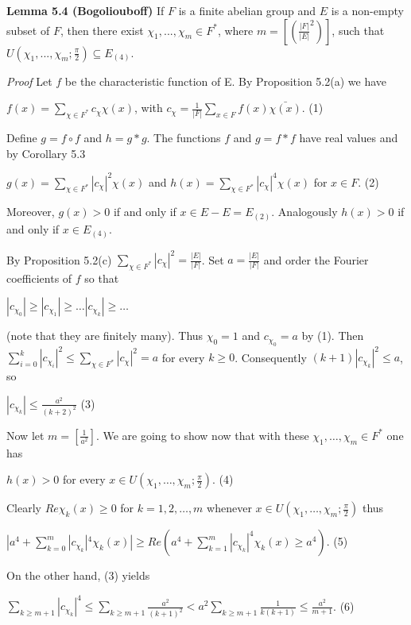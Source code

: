 \documentclass[12pt]{article}
\begin{document}
\textbf{Lemma 5.4 (Bogoliouboff)} If $F$ is a finite abelian group and $E$ is a non-empty subset of $F$, then
there exist $\chi_1, . . . , \chi_m \in F^*$, where $m = [(\frac{|F|}{|E|}^2)]$, such that $U(\chi_1, . . . , \chi_m ; \frac{\pi}{2}) \subseteq E_{(4)}$.


\emph{Proof} Let $f$ be the characteristic function of E. By Proposition 5.2(a) we have


    $f(x) = \sum_{\chi \in F^*} c_\chi \chi(x)$, with $c_\chi = \frac{1}{|F|} \sum_{x \in F} f(x) \bar{\chi(x)}$.  (1)


Define $g = f \circ f$ and $h = g * g$. The functions $f$ and $g = f * f$ have real values and by Corollary 5.3


    $g(x) = \sum_{\chi \in F^*} |c_\chi|^2 \chi(x)$ and $h(x) = \sum_{\chi \in F^*} |c_\chi|^4 \chi(x)$ for $x \in F$.  (2)


Moreover, $g(x) > 0$ if and only if $x \in E - E = E_{(2)}$. Analogously $h(x) > 0$ if and only if $x \in E_{(4)}$.


    By Proposition 5.2(c) $\sum_{\chi \in F^*} |c_\chi|^2 = \frac{|E|}{|F|}$. Set $a = \frac{|E|}{|F|}$ and order the Fourier coefficients of $f$ so that


        $|c_{\chi_0}| \geq |c_{\chi_1}| \geq \dots |c_{\chi_k}| \geq \dots$


(note that they are finitely many). Thus $\chi_0 = 1$ and $c_{\chi_0} = a$ by (1). Then $\sum^k_{i=0} |c_{\chi_i}|^2 \leq \sum_{\chi \in F^*} |c_\chi|^2 = a$ for
every $k \geq 0$. Consequently $(k + 1) |c_{\chi_k}|^2 \leq a$, so


        $|c_{\chi_k}| \leq \frac{a^2}{(k + 2)^2}$  (3)


Now let $m = [\frac{1}{a^2}]$. We are going to show now that with these $\chi_1, \dots, \chi_m \in F^*$ one has


    $h(x) > 0$ for every $x \in U(\chi_1, \dots, \chi_m; \frac{\pi}{2})$.  (4)


Clearly $Re\chi_k(x) \geq 0$ for $k = 1,2, \dots, m$ whenever $x \in U(\chi_1, \dots, \chi_m; \frac{\pi}{2})$ thus


    $|a^4 + \sum^m_{k = 0} |c_{\chi_k}|^4 \chi_k(x)| \geq Re(a^4 + \sum^m_{k=1} |c_{\chi_k}|^4 \chi_k (x) \geq a^4)$.  (5)


On the other hand, (3) yields


    $\sum_{k \geq m + 1} |c_{\chi_k}|^4 \leq \sum_{k \geq m + 1} \frac{a^2}{(k + 1)^2} < a^2 \sum_{k \geq m + 1} \frac{1}{k(k+1)} \leq \frac{a^2}{m+1}$. (6)
\end{document}

